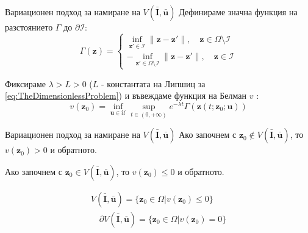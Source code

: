 \begin{frame}[c]{Вариационен подход за намиране на $V(\bar{\boldsymbol{I}}, \bar{\boldsymbol{u}})$}
  Дефинираме значна функция на разстоянието $\Gamma$ до $\partial \mathscr{I}$:
  \begin{equation*}
    \Gamma(\boldsymbol{z}) =
    \begin{cases}
      \inf_{\boldsymbol{z}' \in \mathscr{I}} \|\boldsymbol{z}-\boldsymbol{z}'\|, \quad \boldsymbol{z} \in \Omega \setminus \mathscr{I} \\
      -\inf_{\boldsymbol{z}' \in \Omega \setminus \mathscr{I}} \|\boldsymbol{z}-\boldsymbol{z}'\|, \quad \boldsymbol{z} \in \mathscr{I}
    \end{cases}
  \end{equation*}

  Фиксираме $\lambda>L>0$ ($L$ - константата на Липшиц за \eqref{eq:TheDimensionlessProblem}) и въвеждаме функция на Белман $v$ \cite{Zidani2013}:
  \begin{equation*}
    v(\boldsymbol{z}_0) = \inf_{\boldsymbol{u} \in \mathscr{U}} \sup_{t \in (0, +\infty)} e^{-\lambda t} \Gamma(\boldsymbol{z}(t; \boldsymbol{z}_0; \boldsymbol{u}))
  \end{equation*}

\end{frame}

\begin{frame}[c]{Вариационен подход за намиране на $V(\bar{\boldsymbol{I}}, \bar{\boldsymbol{u}})$}
  Ако започнем с $\boldsymbol{z}_0 \notin V(\bar{\boldsymbol{I}}, \bar{\boldsymbol{u}})$, то $v(\boldsymbol{z}_0) > 0$ и обратното.

  Ако започнем с $\boldsymbol{z}_0 \in V(\bar{\boldsymbol{I}}, \bar{\boldsymbol{u}})$, то $v(\boldsymbol{z}_0) \leq 0$ и обратното.

  \begin{equation*}
    \begin{split}
      V(\bar{\boldsymbol{I}}, \bar{\boldsymbol{u}}) = \{\boldsymbol{z}_0 \in \Omega \vert v(\boldsymbol{z}_0) \leq 0\}\\ \quad \partial V(\bar{\boldsymbol{I}}, \bar{\boldsymbol{u}}) = \{\boldsymbol{z}_0 \in \Omega \vert v(\boldsymbol{z}_0) = 0\}
    \end{split}
  \end{equation*}
\end{frame}


